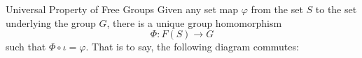 \documentclass[12pt, a4paper, twoside, openright, titlepage]{book}
\begin{document}
\begin{defn}{Universal Property of Free Groups}{}
        Given any set map $\varphi$ from the set $S$ to the set underlying the group $G$, there is a unique group homomorphism \begin{equation}
                \Phi:F(S) \rightarrow G
        \end{equation}
        such that $\Phi\circ \iota = \varphi$. That is to say, the following diagram commutes: 
        \begin{center}
        \end{center}
\end{defn}
\end{document}
